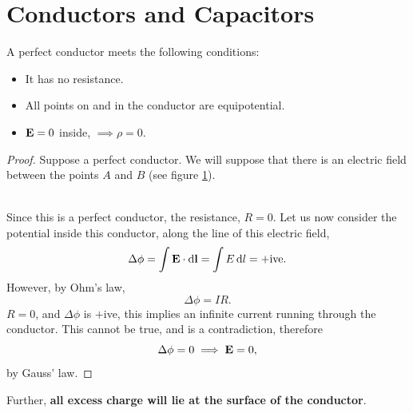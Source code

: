 \documentclass{book}
\begin{document}
\section{Conductors and Capacitors}
A perfect conductor meets the following conditions:
\begin{itemize}
    \item It has no resistance.
    \item All points on and in the conductor are equipotential.
    \item $\vb{E} = 0$ inside, $\implies \rho = 0$.
\end{itemize}
\begin{proof}
    Suppose a perfect conductor. We will suppose that there is an electric field between the points $A$ and $B$ (see figure \ref{fig:cond}).
    \begin{figure}[h]
        \centering
        \caption{}
        \label{fig:cond}
    \end{figure}
    \\
    Since this is a perfect conductor, the resistance, $R = 0$. Let us now consider the potential inside this conductor, along the line of this electric field,
    \begin{equation*}
        \Delta\phi = \int \vb{E}\cdot\dd{\vb{l}} = \int E\dd{l} = +\text{ive}.
    \end{equation*}
    However, by Ohm's law,
    \begin{equation}
        \Delta\phi = IR.
    \end{equation}
    $R=0$, and $\Delta\phi$ is $+$ive, this implies an infinite current running through the conductor. This cannot be true, and is a contradiction, therefore
    $$\Delta\phi = 0 \implies \vb{E} = 0,$$
    by Gauss' law. 
\end{proof}
\noindent
Further, \textbf{all excess charge will lie at the surface of the conductor}.
\end{document}

